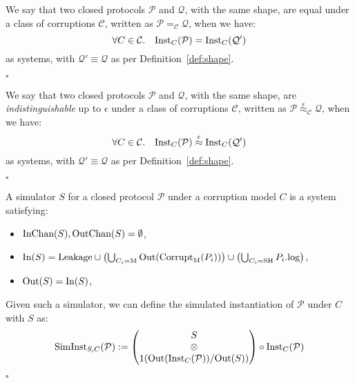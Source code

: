 \begin{definition}
  We say that two closed protocols $\mathcal{P}$ and $\mathcal{Q}$,
  with the same shape,
  are equal under a class of corruptions $\mathcal{C}$,
  written as $\mathcal{P} =_{\mathcal{C}} \mathcal{Q}$, when we have:
  $$
  \forall C \in \mathcal{C}.\quad \text{Inst}_C(\mathcal{P}) = \text{Inst}_C(\mathcal{Q'})
  $$
  as systems, with $\mathcal{Q}' \equiv \mathcal{Q}$ as per 
  Definition~\ref{def:shape}.

  $\square$

\end{definition}

\begin{definition}[Indistinguishability]
  We say that two closed protocols $\mathcal{P}$ and $\mathcal{Q}$,
  with the same shape,
  are \emph{indistinguishable} up to $\epsilon$ under a class of corruptions $\mathcal{C}$,
  written as $\mathcal{P} \overset{\epsilon}{\approx}_{\mathcal{C}} \mathcal{Q}$, when we have:
  $$
  \forall C \in \mathcal{C}.\quad \text{Inst}_C(\mathcal{P}) \overset{\epsilon}{\approx} \text{Inst}_C(\mathcal{Q'})
  $$
  as systems, with $\mathcal{Q}' \equiv \mathcal{Q}$ as per 
  Definition~\ref{def:shape}.

  $\square$

\end{definition}

\begin{definition}
  A simulator $S$ for a closed protocol $\mathcal{P}$ under a corruption
  model $C$ is a system satisfying:
  \begin{itemize}
    \item $\text{InChan}(S), \text{OutChan}(S) = \emptyset$,
    \item $\text{In}(S) = \text{Leakage} \cup \left(\bigcup_{C_i = \text{M}} \text{Out}(\text{Corrupt}_{\text{M}}(P_i))\right) \cup \left(\bigcup_{C_i = \text{SH}} P_i.\text{log}\right)$,
    \item $\text{Out}(S) = \text{In}(S)$,
  \end{itemize}

  Given such a simulator, we can define the simulated instantiation
  of $\mathcal{P}$ under $C$ with $S$ as:
  $$
  \text{SimInst}_{S, C}(\mathcal{P}) := 
  \begin{pmatrix}
    S\cr
    \otimes\cr
    1(\text{Out}(\text{Inst}_C(\mathcal{P})) / \text{Out}(S))
  \end{pmatrix}
  \circ \text{Inst}_C(\mathcal{P})
  $$

  $\square$
\end{definition}

